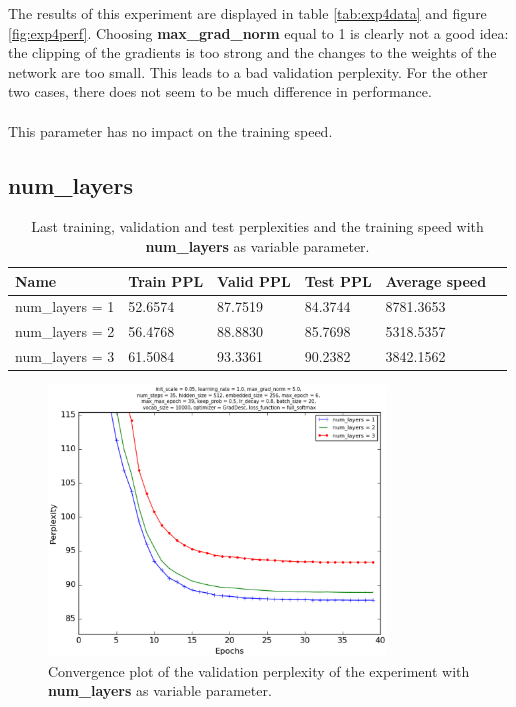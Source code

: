 \documentclass[10pt,a4paper,titlepage]{article}
\begin{document}
The results of this experiment are displayed in table \ref{tab:exp4data} and figure \ref{fig:exp4perf}. Choosing \textbf{max\_grad\_norm} equal to 1 is clearly not a good idea: the clipping of the gradients is too strong and the changes to the weights of the network are too small. This leads to a bad validation perplexity. For the other two cases, there does not seem to be much difference in performance.\\
\\
This parameter has no impact on the training speed.

\newpage

\subsection{num\_layers}

\begin{table}[H]
\centering
\caption{Last training, validation and test perplexities and the training speed with \textbf{num\_layers} as variable parameter.}
\label{tab:exp5data}
\begin{tabular}{|l|l|l|l|l|l|}
\hline
{\small Name} & {\small Train PPL} & {\small Valid PPL} & {\small Test PPL} & {\small Average speed}\\ \hline
{\small num\_layers = 1 }                               & 52.6574    & 87.7519    & 84.3744    & 8781.3653  \\ \hline
{\small num\_layers = 2}                                & 56.4768    & 88.8830    & 85.7698    & 5318.5357  \\ \hline
{\small num\_layers = 3}                                & 61.5084    & 93.3361    & 90.2382    & 3842.1562  \\ \hline
\end{tabular}
\end{table}

\begin{figure}[H]
	\begin{center}
		\includegraphics[width=0.80\textwidth]{Figures/numlayersperf.eps}
		\caption{Convergence plot of the validation perplexity of the experiment with \textbf{num\_layers} as variable parameter. }
		\label{fig:exp5perf}
	\end{center}	
\end{figure}
\end{document}
